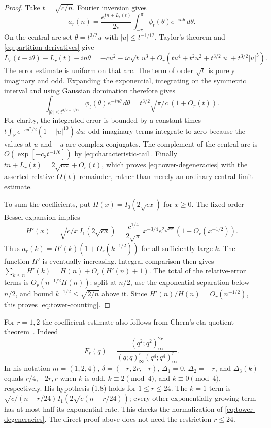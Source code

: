 \begin{proof}
Take $t=\sqrt{c/n}$.  Fourier inversion gives
\[
 a_r(n)=\frac{e^{tn+L_r(t)}}{2\pi}
    \int_{-\pi}^{\pi}\phi_t(\theta)e^{-in\theta}\,d\theta.
\]
On the central arc set $\theta=t^{3/2}u$ with
$|u|\leq t^{-1/12}$.  Taylor's theorem and
\eqref{eq:partition-derivatives} give
\[
 L_r(t-i\theta)-L_r(t)-in\theta
 =-cu^2-ic\sqrt t\,u^3
   +O_r\!\left(tu^4+t^2u^2+t^{3/2}|u|
                    +t^{3/2}|u|^5\right).
\]
The error estimate is uniform on that arc.  The term of order
$\sqrt t$ is purely imaginary and odd.  Expanding the exponential,
integrating on the symmetric interval and using Gaussian domination
therefore gives
\[
 \int_{|\theta|\leq t^{3/2-1/12}}
          \phi_t(\theta)e^{-in\theta}\,d\theta
 =t^{3/2}\sqrt{\pi/c}\,(1+O_r(t)).
\]
For clarity, the integrated error is bounded by a constant times
$t\int_{\mathbb R}e^{-c u^2/2}(1+|u|^{10})\,du$;
odd imaginary terms integrate to zero because the values at $u$ and
$-u$ are complex conjugates.  The complement of the central arc is
$O(\exp[-c_3t^{-1/6}])$ by \eqref{eq:characteristic-tail}.
Finally $tn+L_r(t)=2\sqrt{cn}+O_r(t)$, which proves
\eqref{eq:tower-degeneracies} with the asserted relative $O(t)$
remainder, rather than merely an ordinary central limit estimate.

To sum the coefficients, put $H(x)=I_0(2\sqrt{cx})$ for $x\geq0$.
The fixed-order Bessel expansion implies
\[
 H'(x)=\sqrt{c/x}\,I_1(2\sqrt{cx})
 =\frac{c^{1/4}}{2\sqrt\pi}\,x^{-3/4}e^{2\sqrt{cx}}
      (1+O_r(x^{-1/2})).
\]
Thus $a_r(k)=H'(k)(1+O_r(k^{-1/2}))$ for all sufficiently large $k$.
The function $H'$ is eventually increasing.  Integral comparison
then gives $\sum_{k\leq n}H'(k)=H(n)+O_r(H'(n)+1)$.
The total of the relative-error terms is $O_r(n^{-1/2}H(n))$:
split at $n/2$, use the exponential separation below $n/2$, and
bound $k^{-1/2}\leq\sqrt{2/n}$ above it.  Since
$H'(n)/H(n)=O_r(n^{-1/2})$, this proves \eqref{eq:tower-counting}.
\end{proof}

\begin{remark}
For $r=1,2$ the coefficient estimate also follows from Chern's eta-quotient theorem~\cite[Theorem~1.1]{Chern19}.  Indeed
\[
 F_r(q)=\frac{(q^2;q^2)_\infty^{2r}}
                 {(q;q)_\infty^r(q^4;q^4)_\infty^r}.
\]
In his notation $m=(1,2,4)$, $\delta=(-r,2r,-r)$,
$\Delta_1=0$, $\Delta_2=-r$, and
$\Delta_3(k)$ equals $r/4,-2r,r$ when $k$ is odd,
$k\equiv2\pmod4$, and $k\equiv0\pmod4$, respectively.
His hypothesis (1.8) holds for $1\leq r\leq24$.
The $k=1$ term is
$\sqrt{c/(n-r/24)}I_1(2\sqrt{c(n-r/24)})$; every other exponentially
growing term has at most half its exponential rate.  This checks the
normalization of \eqref{eq:tower-degeneracies}.  The direct proof above
does not need the restriction $r\leq24$.
\end{remark}

